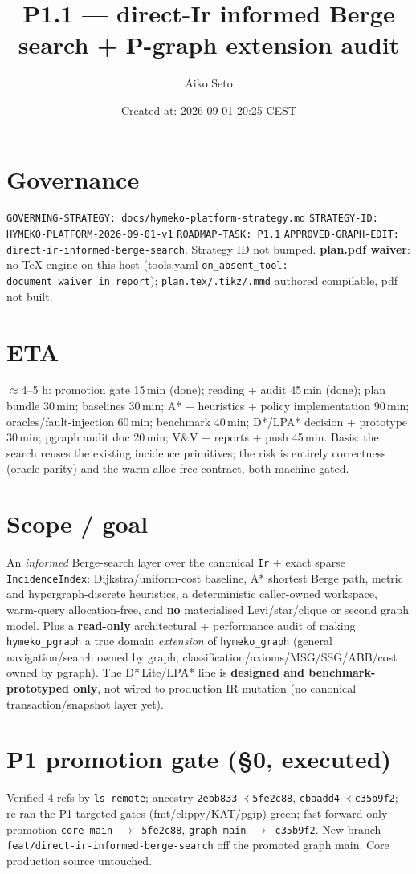 \documentclass[11pt]{article}
\title{P1.1 --- direct-Ir informed Berge search + P-graph extension audit}\author{Aiko Seto}
\date{Created-at: 2026-09-01 20:25 CEST}
\begin{document}
\maketitle

\section*{Governance}
\texttt{GOVERNING-STRATEGY: docs/hymeko-platform-strategy.md} \textperiodcentered{}
\texttt{STRATEGY-ID: HYMEKO-PLATFORM-2026-09-01-v1} \textperiodcentered{} \texttt{ROADMAP-TASK: P1.1}
\textperiodcentered{} \texttt{APPROVED-GRAPH-EDIT: direct-ir-informed-berge-search}. Strategy ID not
bumped. \textbf{plan.pdf waiver}: no TeX engine on this host (tools.yaml \texttt{on\_absent\_tool:
document\_waiver\_in\_report}); \texttt{plan.tex/.tikz/.mmd} authored compilable, pdf not built.

\section*{ETA}
$\approx$4--5 h: promotion gate 15\,min (done); reading + audit 45\,min (done); plan bundle 30\,min;
baselines 30\,min; A* + heuristics + policy implementation 90\,min; oracles/fault-injection 60\,min;
benchmark 40\,min; D*/LPA* decision + prototype 30\,min; pgraph audit doc 20\,min; V\&V + reports + push
45\,min. Basis: the search reuses the existing incidence primitives; the risk is entirely correctness
(oracle parity) and the warm-alloc-free contract, both machine-gated.

\section*{Scope / goal}
An \emph{informed} Berge-search layer over the canonical \texttt{Ir} + exact sparse
\texttt{IncidenceIndex}: Dijkstra/uniform-cost baseline, A* shortest Berge path, metric and
hypergraph-discrete heuristics, a deterministic caller-owned workspace, warm-query allocation-free, and
\textbf{no} materialised Levi/star/clique or second graph model. Plus a \textbf{read-only} architectural +
performance audit of making \texttt{hymeko\_pgraph} a true domain \emph{extension} of \texttt{hymeko\_graph}
(general navigation/search owned by graph; classification/axioms/MSG/SSG/ABB/cost owned by pgraph). The
D*\,Lite/LPA* line is \textbf{designed and benchmark-prototyped only}, not wired to production IR mutation
(no canonical transaction/snapshot layer yet).

\section*{P1 promotion gate (§0, executed)}
Verified 4 refs by \texttt{ls-remote}; ancestry \texttt{2ebb833}$\prec$\texttt{5fe2c88},
\texttt{cbaadd4}$\prec$\texttt{c35b9f2}; re-ran the P1 targeted gates (fmt/clippy/KAT/pgip) green;
fast-forward-only promotion \texttt{core main $\to$ 5fe2c88}, \texttt{graph main $\to$ c35b9f2}. New branch
\texttt{feat/direct-ir-informed-berge-search} off the promoted graph main. Core production source untouched.
\end{document}
